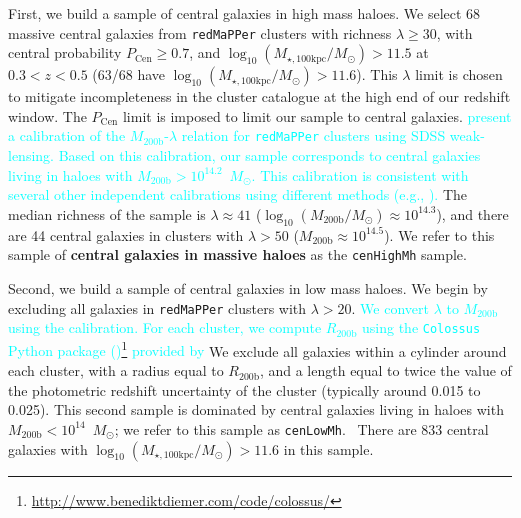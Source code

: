 \documentclass[a4paper,fleqn,usenatbib]{mnras}
\def\msun{$M_\odot$}
\def\redm{\texttt{redMaPPer}}
\def\rbcg{\texttt{cenHighMh}}
\def\nbcg{\texttt{cenLowMh}}
\def\mstar{{$M_{\star}$}}
\def\mhalo{{$M_{\mathrm{200b}}$}}
\def\logmhalo{{$\log_{10} (M_{\mathrm{200b}}/M_{\odot})$}}
\def\logmtot{{$\log_{10} (M_{\star,100\mathrm{kpc}}/M_{\odot})$}}
\newcommand{\song}[1]{\textcolor{cyan}{#1}}
\begin{document}
 
    First, we build a sample of central galaxies in high mass haloes. 
    We select 68 massive central galaxies from \redm{} clusters with richness
    $\lambda \geq 30$, with central probability $P_{\mathrm{Cen}} \geq 0.7$, and 
    \logmtot{}$ >11.5$ at $0.3 < z < 0.5$ (63/68 have \logmtot{}$ >11.6$). 
    This $\lambda$ limit is chosen to mitigate incompleteness in the cluster catalogue
    at the high end of our redshift window. 
    The $P_{\mathrm{Cen}}$ limit is imposed to limit our sample to central galaxies. 
    \song{
    \citet{Simet2017} present a calibration of the \mhalo{}-$\lambda$ relation for 
    \redm{} clusters using SDSS weak-lensing. 
    Based on this calibration, our sample corresponds to central galaxies living 
    in haloes with \mhalo{}$>10^{14.2}$~\msun{}. 
    This calibration is consistent with several other independent calibrations 
    using different methods (e.g., \citealt{Saro2015, Farahi2016, 
    Melchior2016, Murata2017}). 
    }
    The median richness of the sample is $\lambda \approx 41$ 
    (\logmhalo{}$\approx 10^{14.3}$), and there are 44 central galaxies 
    in clusters with $\lambda>50$ (\mhalo{}$\approx 10^{14.5}$).
    We refer to this sample of \textbf{central galaxies in massive haloes} as 
    the \rbcg{} sample.
    
    Second, we build a sample of central galaxies in low mass haloes. 
    We begin by excluding all galaxies in \redm{} clusters with $\lambda > 20$.
    \song{
    We convert $\lambda$ to $M_{\mathrm{200b}}$ using the \citet{Simet2017} calibration. 
    For each cluster, we compute $R_{\mathrm{200b}}$ using the \texttt{Colossus} Python 
    package 
    (\citealt{Colossus})\footnote{\url{http://www.benediktdiemer.com/code/colossus/}}
    provided by \citet{Diemer2015}
    } 
    We exclude all galaxies within a cylinder around each cluster, with a radius
    equal to $R_{\mathrm{200b}}$, and a length equal to twice the value of the 
    photometric redshift uncertainty of the cluster (typically around 0.015 to 0.025).
    This second sample is dominated by central galaxies living in haloes with
    $M_{\mathrm{200b}} < 10^{14}$~\msun{}; we refer to this sample as \nbcg{}. \
    There are 833 central galaxies with \logmtot{}$> 11.6$ in this sample.
\end{document}

